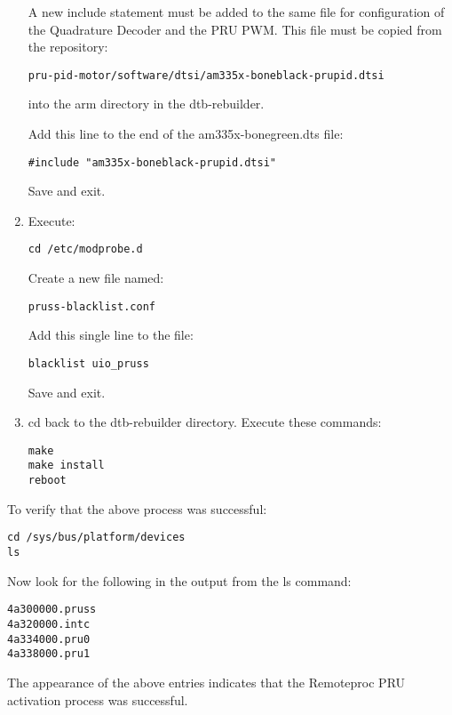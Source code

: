\begin{enumerate}
A new include statement must be added to the same file for configuration of the Quadrature Decoder and the PRU PWM.  This file must be copied from the repository:

\begin{verbatim}
pru-pid-motor/software/dtsi/am335x-boneblack-prupid.dtsi
\end{verbatim}

into the arm directory in the dtb-rebuilder.

Add this line to the end of the am335x-bonegreen.dts file:

\begin{verbatim}
#include "am335x-boneblack-prupid.dtsi"
\end{verbatim}
 
Save and exit.
\item
Execute:
\begin{verbatim}
cd /etc/modprobe.d
\end{verbatim}
Create a new file named:
\begin{verbatim}
pruss-blacklist.conf
\end{verbatim} 

Add this single line to the file:
\begin{verbatim}
blacklist uio_pruss
\end{verbatim}
Save and exit.
\item
cd back to the dtb-rebuilder directory.  Execute these commands:
\begin{verbatim}
make 
make install 
reboot
\end{verbatim} 
\end{enumerate}
To verify that the above process was successful:

\begin{verbatim}
cd /sys/bus/platform/devices
ls
\end{verbatim}

Now look for the following in the output from the ls command:
\begin{verbatim}
4a300000.pruss
4a320000.intc
4a334000.pru0
4a338000.pru1
\end{verbatim}

The appearance of the above entries indicates that the Remoteproc PRU activation process was successful.

